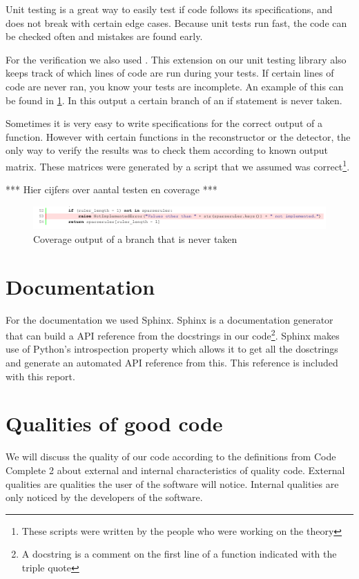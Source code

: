\documentclass[a4paper, openany, oneside]{memoir}
\begin{document}
Unit testing is a great way to easily test if code follows its specifications, and does not break with certain edge cases. Because unit tests run fast, the code can be checked often and mistakes are found early.

For the verification we also used . This extension on our unit testing library also keeps track of which lines of code are run during your tests. If certain lines of code are never ran, you know your tests are incomplete. An example of this can be found in \cref{fig:coverage_branch}. In this output a certain branch of an if statement is never taken.

Sometimes it is very easy to write specifications for the correct output of a function. However with certain functions in the reconstructor or the detector, the only way to verify the results was to check them according to known output matrix. These matrices were generated by a \matlab{} script that we assumed was correct\footnote{These \matlab{} scripts were written by the people who were working on the theory}.

*** Hier cijfers over aantal testen en coverage ***

\begin{figure}[h]
    \centering
    \includegraphics[width=\textwidth]{fig_branch_coverage.pdf}
    \caption{Coverage output of a branch that is never taken}
    \label{fig:coverage_branch}
\end{figure}

\section{Documentation}
\label{sec:documentation}
For the documentation we used Sphinx. Sphinx is a documentation generator that can build a API reference from the docstrings in our code\footnote{A docstring is a comment on the first line of a function indicated with the triple quote}. Sphinx makes use of Python's introspection property which allows it to get all the dosctrings and generate an automated API reference from this. This reference is included with this report.

\section{Qualities of good code}
We will discuss the quality of our code according to the definitions from Code Complete 2 about external and internal characteristics of quality code. External qualities are qualities the user of the software will notice. Internal qualities are only noticed by the developers of the software.\cite{mcconnell2004code}
\end{document}
